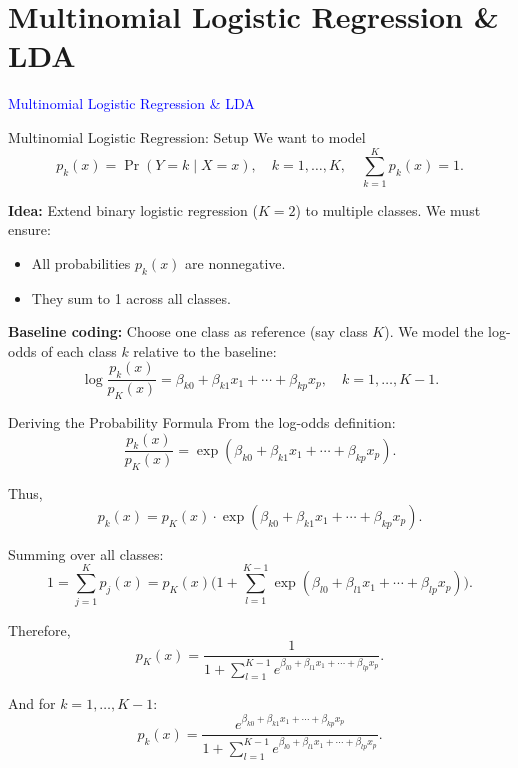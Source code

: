 \documentclass[../../main.tex]{subfiles}
\begin{document}
\graphicspath{{figures/}{lectures/04_multinomial_lda/figures/}}
\section{Multinomial Logistic Regression \& LDA}
\begin{frame}[plain]
  \vfill\begin{center}{\Huge \textcolor{blue}{Multinomial Logistic Regression \& LDA}}\end{center}\vfill
\end{frame}



\begin{frame}{Multinomial Logistic Regression: Setup}
\small
We want to model
\[
p_k(x) = \Pr(Y=k \mid X=x), \quad k=1,\dots,K, \quad \sum_{k=1}^K p_k(x) = 1.
\]

\textbf{Idea:} Extend binary logistic regression ($K=2$) to multiple classes.  
We must ensure:
\begin{itemize}
    \item All probabilities $p_k(x)$ are nonnegative.
    \item They sum to 1 across all classes.
\end{itemize}

\textbf{Baseline coding:} Choose one class as reference (say class $K$).  
We model the log-odds of each class $k$ relative to the baseline:
\[
\log \frac{p_k(x)}{p_K(x)} = \beta_{k0} + \beta_{k1}x_1 + \cdots + \beta_{kp}x_p,
\quad k=1,\dots,K-1.
\]
\end{frame}

\begin{frame}{Deriving the Probability Formula}
\small
From the log-odds definition:
\[
\frac{p_k(x)}{p_K(x)} = \exp(\beta_{k0} + \beta_{k1}x_1 + \cdots + \beta_{kp}x_p).
\]

Thus,
\[
p_k(x) = p_K(x) \cdot \exp(\beta_{k0} + \beta_{k1}x_1 + \cdots + \beta_{kp}x_p).
\]

Summing over all classes:
\[
1 = \sum_{j=1}^K p_j(x) 
= p_K(x) \Big( 1 + \sum_{l=1}^{K-1} \exp(\beta_{l0} + \beta_{l1}x_1 + \cdots + \beta_{lp}x_p) \Big).
\]

Therefore,
\[
p_K(x) = \frac{1}{1 + \sum_{l=1}^{K-1} e^{\beta_{l0} + \beta_{l1}x_1 + \cdots + \beta_{lp}x_p}}.
\]

And for $k=1,\dots,K-1$:
\[
p_k(x) = \frac{e^{\beta_{k0} + \beta_{k1}x_1 + \cdots + \beta_{kp}x_p}}{1 + \sum_{l=1}^{K-1} e^{\beta_{l0} + \beta_{l1}x_1 + \cdots + \beta_{lp}x_p}}.
\]
\end{frame}
\end{document}
